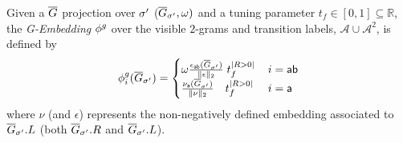 \begin{definition}[G-Embedding]\label{def:ppne}
	
Given a $\overline{G}$ projection over ${\sigma'}$ ($\overline{G}_{\sigma'},\omega)$ and a tuning parameter $t_f\in[0,1]\subseteq\mathbb{R}$, the \emph{G-Embedding} $\phi^{g}$ over the visible $2$-grams and transition labels, $\mathcal{A}\cup\mathcal{A}^2$, is defined by
$$\phi^{g}_{i}(\overline{G}_{\sigma'})=\begin{cases}
	\omega \frac{\epsilon_{\mathsf{ab}}(\overline{G}_{\sigma'})}{\|\epsilon\|_2}\;t_f^{|R>0|}\, & {i}=\mathsf{ab}\\
	\frac{\nu_{\mathsf{a}}(\overline{G}_{\sigma'})}{\|\nu\|_2}\;\;\;\,t_f^{|R>0|}\, & {i}=\mathsf{a}\\
\end{cases}$$
where $\nu$ (and $\epsilon$) represents the non-negatively defined embedding associated to $\overline{G}_{\sigma'}.L$ (both $\overline{G}_{\sigma'}.R$ and $\overline{G}_{\sigma'}.L$).
\end{definition}
